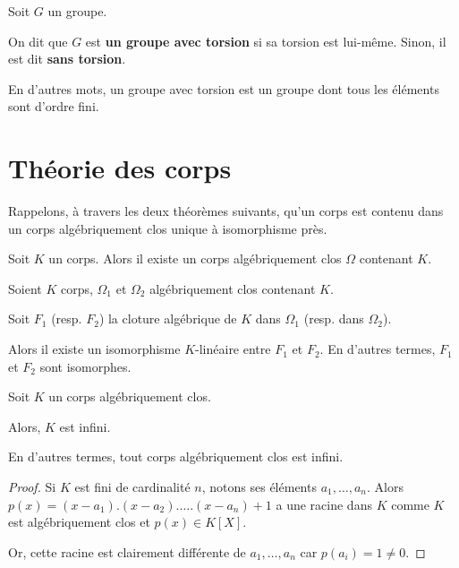 \documentclass[a4paper, 12pt]{report}
\begin{document}
\begin{definition} 
	Soit $G$ un groupe.

	On dit que $G$ est \textbf{un groupe avec torsion} si sa torsion est
	lui-même.
	Sinon, il est dit \textbf{sans torsion}.

	En d'autres mots, un groupe avec torsion est un groupe dont tous les
	éléments sont d'ordre fini.
\end{definition}

\section{Théorie des corps}

Rappelons, à travers les deux théorèmes suivants, qu'un corps est contenu dans
un corps algébriquement clos unique à isomorphisme près.

\begin{theorem}
	Soit $K$ un corps. Alors il existe un corps algébriquement clos $\Omega$
	contenant $K$.
\end{theorem}

\begin{theorem}
	Soient $K$ corps, $\Omega_{1}$ et $\Omega_{2}$ algébriquement clos contenant
	$K$.

	Soit $F_{1}$ (resp. $F_{2}$) la cloture algébrique de $K$ dans $\Omega_{1}$
	(resp. dans $\Omega_{2}$).

	Alors il existe un isomorphisme $K$-linéaire entre $F_{1}$ et $F_{2}$. En
	d'autres termes, $F_{1}$ et $F_{2}$ sont isomorphes.
\end{theorem}

\begin{proposition}
	Soit $K$ un corps algébriquement clos.

	Alors, $K$ est infini.

	En d'autres termes, tout corps algébriquement clos est infini.
\end{proposition}

\ifdefined\outputproof
\begin{proof}
	Si $K$ est fini de cardinalité $n$, notons ses éléments $a_{1}, \dots,
	a_{n}$. Alors $p(x) = (x - a_{1}) . (x - a_{2}) . \dots . (x - a_{n}) + 1$ a
	une racine dans $K$ comme $K$ est algébriquement clos et $p(x) \in K[X]$.

	Or, cette racine est clairement différente de $a_{1}, \dots, a_{n}$ car
	$p(a_{i}) = 1 \neq 0$.
\end{proof}
\fi
\end{document}
